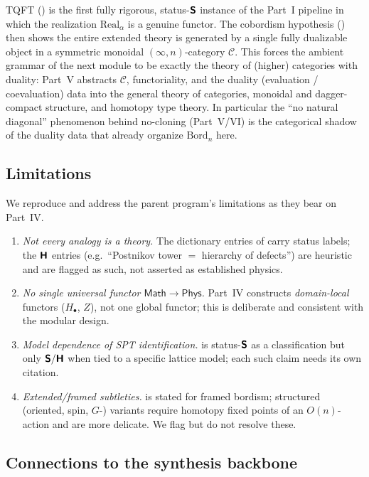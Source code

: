 \documentclass[12pt]{article}
\theoremstyle{definition}
\theoremstyle{remark}
\newcommand{\Bord}{\mathrm{Bord}}
\newcommand{\Phys}{\mathsf{Phys}}
\newcommand{\Math}{\mathsf{Math}}
\newcommand{\Real}{\mathrm{Real}}
\newcommand{\Sfont}{\textnormal{\sffamily\bfseries S}}
\newcommand{\Hfont}{\textnormal{\sffamily\bfseries H}}
\begin{document}
TQFT () is the first fully rigorous, status-$\Sfont$ instance
of the Part~I pipeline in which the realization $\Real_\alpha$ is a genuine
functor. The cobordism hypothesis () then shows the entire
extended theory is generated by a single fully dualizable object in a symmetric
monoidal $(\infty,n)$-category $\mathcal{C}$. This forces the ambient grammar of
the next module to be exactly the theory of (higher) categories with duality:
Part~V abstracts $\mathcal{C}$, functoriality, and the duality (evaluation /
coevaluation) data into the general theory of categories, monoidal and
dagger-compact structure, and homotopy type theory. In particular the ``no natural
diagonal'' phenomenon behind no-cloning (Part~V/VI) is the categorical shadow of
the duality data that already organize $\Bord_n$ here.

\subsection{Limitations}

We reproduce and address the parent program's limitations as they bear on Part~IV.
\begin{enumerate}
  \item \emph{Not every analogy is a theory.} The dictionary entries of
     carry status labels; the $\Hfont$ entries (e.g.\ ``Postnikov
    tower $=$ hierarchy of defects'') are heuristic and are flagged as such, not
    asserted as established physics.
  \item \emph{No single universal functor $\Math\to\Phys$.} Part~IV constructs
    \emph{domain-local} functors ($H_\bullet$, $Z$), not one global functor; this
    is deliberate and consistent with the modular design.
  \item \emph{Model dependence of SPT identification.}  is
    status-$\Sfont$ as a classification but only $\Sfont/\Hfont$ when tied to a
    specific lattice model; each such claim needs its own citation.
  \item \emph{Extended/framed subtleties.}  is stated for
    framed bordism; structured (oriented, spin, $G$-) variants require homotopy
    fixed points of an $O(n)$-action and are more delicate. We flag but do not
    resolve these.
\end{enumerate}

\subsection{Connections to the synthesis backbone}
\end{document}
